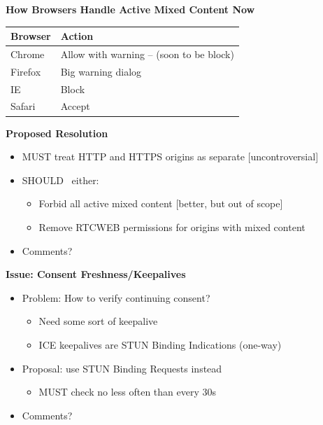 \documentclass[helvetica]{seminar}
\newcommand{\heading}[1]{%
  \begin{center} 
    \large\bf 
    #1 
  \end{center} 
  \vspace{.4 in}}
\begin{document}
\begin{slide}
\heading{How Browsers Handle Active Mixed Content Now}

\begin{center}
\begin{tabular}{l p{2.5in}}
Browser & Action \\
\hline
Chrome & Allow with warning -- (soon to be block) \\
Firefox & Big warning dialog \\
IE & Block \\
Safari & Accept \\
\end{tabular}
\end{center}

\end{slide}



\begin{slide}
\heading{Proposed Resolution}

\begin{itemize}
\item MUST treat HTTP and HTTPS origins as separate [uncontroversial]
\item SHOULD~ either:
  \begin{itemize}
  \item Forbid all active mixed content [better, but out of scope]
  \item Remove RTCWEB permissions for origins with mixed content
  \end{itemize}

\item Comments?
\end{itemize}

\vspace{.5in}
\end{slide}



\begin{slide}
\heading{Issue: Consent Freshness/Keepalives}

\begin{itemize}
\item Problem: How to verify continuing consent?
  \begin{itemize}
  \item Need some sort of keepalive
  \item ICE keepalives are STUN Binding Indications (one-way)
  \end{itemize}

\item Proposal: use STUN Binding Requests instead
  \begin{itemize}
  \item MUST check no less often than every 30s
  \end{itemize}

\item Comments?
\end{itemize}

\end{slide}
\end{document}

